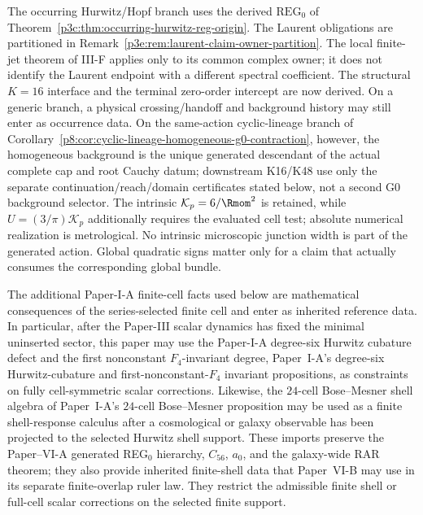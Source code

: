 \documentclass[12pt,a4paper]{article}
\begin{document}
\begin{remark}
\label{p8:rem:m8-batch-cosmology-inputs}
The occurring Hurwitz/Hopf branch uses the derived
\(\mathrm{REG}_0\) of
Theorem~\ref{p3c:thm:occurring-hurwitz-reg-origin}.
The Laurent obligations are partitioned in
Remark~\ref{p3e:rem:laurent-claim-owner-partition}.
The local finite-jet theorem of III-F applies only to
its common complex owner; it does not identify the
Laurent endpoint with a different spectral coefficient.
The structural \(K=16\) interface and the terminal zero-order intercept are
now derived.  On a generic branch, a physical crossing/handoff and background
history may still enter as occurrence data.  On the same-action cyclic-lineage
branch of Corollary~\ref{p8:cor:cyclic-lineage-homogeneous-g0-contraction},
however, the homogeneous background is the unique generated descendant of the
actual complete cap and root Cauchy datum; downstream K16/K48 use only the
separate continuation/reach/domain certificates stated below, not a second G0
background selector.  The intrinsic $\mathcal K_p=6/\Rmom^2$ is retained, while $U=(3/\pi)\mathcal K_p$ additionally requires the evaluated cell test;
absolute numerical realization is metrological.  No intrinsic microscopic
junction width is part of the generated action.
Global quadratic signs matter only for a claim that
actually consumes the corresponding global bundle.
\end{remark}



\begin{remark}
\label{p8:rem:series-selected-finite-cell-kernels}
The additional Paper-I-A finite-cell facts used below are mathematical consequences of the series-selected finite cell and enter as inherited reference data.  In particular, after the Paper-III scalar dynamics has fixed the minimal uninserted sector, this paper may use the Paper-I-A degree-six Hurwitz cubature defect and the first nonconstant $F_4$-invariant degree, Paper~I-A's degree-six Hurwitz-cubature and first-nonconstant-$F_4$ invariant propositions, as constraints on fully cell-symmetric scalar corrections.  Likewise, the $24$-cell Bose--Mesner shell algebra of Paper~I-A's $24$-cell Bose--Mesner proposition may be used as a finite shell-response calculus after a cosmological or galaxy observable has been projected to the selected Hurwitz shell support.  These imports preserve the Paper--VI-A generated REG$_0$ hierarchy, $C_{56}$, $a_0$, and the galaxy-wide RAR theorem; they also provide inherited finite-shell data that Paper~VI-B may use in its separate finite-overlap ruler law.  They restrict the admissible finite shell or full-cell scalar corrections on the selected finite support.
\end{remark}
\end{document}
